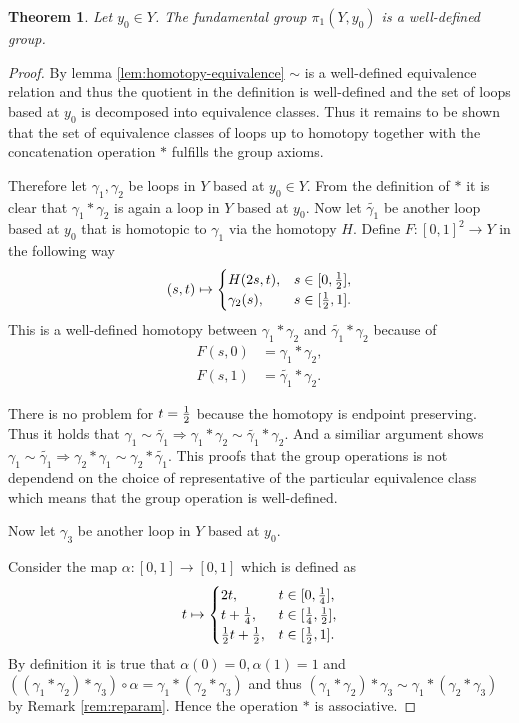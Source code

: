 \documentclass[a4paper, 11pt, twoside]{article}
\theoremstyle{break}
\newtheorem{thm}{Theorem}[section]
\theoremstyle{break}
\begin{document}
\begin{thm}
  Let $y_0 \in Y$. The fundamental group $\pi_1(Y, y_0)$ is a well-defined group. 
\end{thm}

\begin{proof}
  By lemma \ref{lem:homotopy-equivalence} $\sim$ is a well-defined equivalence relation and thus the quotient in the definition is well-defined and the set of loops based at $y_0$ is decomposed into equivalence classes.
  Thus it remains to be shown that the set of equivalence classes of loops up to homotopy together with the concatenation operation $*$ fulfills the group axioms.

  Therefore let $\gamma_1, \gamma_2$ be loops in $Y$ based at $y_0 \in Y$. From the definition of $*$ it is clear that $\gamma_1 * \gamma_2$ is again a loop in $Y$ based at $y_0$.
  Now let $\tilde{\gamma_1}$ be another loop based at $y_0$ that is homotopic to $\gamma_1$ via the homotopy $H$. Define $F\colon [0,1]^2 \to Y$ in the following way
  \begin{equation*}
    (s, t) \mapsto \begin{cases}
      H(2s, t), &s \in [0,{1 \over 2}], \\
      \gamma_2(s), &s \in [{1 \over 2}, 1].
    \end{cases}
  \end{equation*}
  This is a well-defined homotopy between $\gamma_1 * \gamma_2$ and $\tilde{\gamma_1} * \gamma_2$ because of
  \begin{align*}
    F(s, 0) &= \gamma_1 * \gamma_2, \\
    F(s, 1) &= \tilde{\gamma_1} * \gamma_2.
  \end{align*}
  
  There is no problem for $t = {1 \over 2}$ because the homotopy is endpoint preserving. Thus it holds that $\gamma_1 \sim \tilde{\gamma_1} \Rightarrow \gamma_1 * \gamma_2 \sim \tilde{\gamma_1} * \gamma_2$.
  And a similiar argument shows $\gamma_1 \sim \tilde{\gamma_1} \Rightarrow \gamma_2 * \gamma_1 \sim  \gamma_2 * \tilde{\gamma_1}$. 
  This proofs that the group operations is not dependend on the choice of representative of the particular equivalence class which means that the group operation is well-defined.

  Now let $\gamma_3$ be another loop in $Y$ based at $y_0$. 

  Consider the map $\alpha\colon [0,1] \to [0,1]$ which is defined as
  \begin{equation*}
    t \mapsto \begin{cases}
      2t, &t \in [0, {1 \over 4}], \\
      t + {1 \over 4}, &t \in [{1\over4}, {1\over2}], \\
      {1\over2}t + {1\over2}, &t\in[{1\over2}, 1].
    \end{cases}
  \end{equation*}
  By definition it is true that $\alpha(0) = 0, \alpha(1) = 1$ and $((\gamma_1 * \gamma_2) * \gamma_3) \circ \alpha = \gamma_1 * (\gamma_2 * \gamma_3)$ and thus $(\gamma_1 * \gamma_2) * \gamma_3 \sim \gamma_1 * (\gamma_2 * \gamma_3)$ by Remark \ref{rem:reparam}.
  Hence the operation $*$ is associative.
  

\end{proof}
\end{document}
